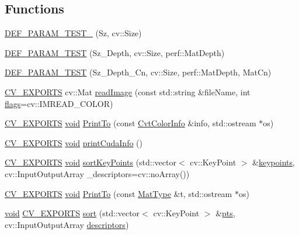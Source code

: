 \subsection*{Functions}
\begin{DoxyCompactItemize}
\item 
\hyperlink{namespaceperf_aee4aac75a52f21b615b8a0e3a5865629}{D\-E\-F\-\_\-\-P\-A\-R\-A\-M\-\_\-\-T\-E\-S\-T\-\_} (Sz, cv\-::\-Size)
\item 
\hyperlink{namespaceperf_abe6d05b643a7d681b3e139d83b9d2d64}{D\-E\-F\-\_\-\-P\-A\-R\-A\-M\-\_\-\-T\-E\-S\-T} (Sz\-\_\-\-Depth, cv\-::\-Size, perf\-::\-Mat\-Depth)
\item 
\hyperlink{namespaceperf_a348406073b8cfba77c7265fcec8466cc}{D\-E\-F\-\_\-\-P\-A\-R\-A\-M\-\_\-\-T\-E\-S\-T} (Sz\-\_\-\-Depth\-\_\-\-Cn, cv\-::\-Size, perf\-::\-Mat\-Depth, Mat\-Cn)
\item 
\hyperlink{core_2types__c_8h_a1bf9f0e121b54272da02379cfccd0a2b}{C\-V\-\_\-\-E\-X\-P\-O\-R\-T\-S} cv\-::\-Mat \hyperlink{namespaceperf_a83899156f75eac1b6ab0c9630ae0f2d0}{read\-Image} (const std\-::string \&file\-Name, int \hyperlink{highgui__c_8h_ae51e3a2d4365e85db9630dd3ce9508db}{flags}=cv\-::\-I\-M\-R\-E\-A\-D\-\_\-\-C\-O\-L\-O\-R)
\item 
\hyperlink{core_2types__c_8h_a1bf9f0e121b54272da02379cfccd0a2b}{C\-V\-\_\-\-E\-X\-P\-O\-R\-T\-S} \hyperlink{legacy_8hpp_a8bb47f092d473522721002c86c13b94e}{void} \hyperlink{namespaceperf_ac433f45f9fbed2bb542f82867dd3823c}{Print\-To} (const \hyperlink{structperf_1_1CvtColorInfo}{Cvt\-Color\-Info} \&info, std\-::ostream $\ast$os)
\item 
\hyperlink{core_2types__c_8h_a1bf9f0e121b54272da02379cfccd0a2b}{C\-V\-\_\-\-E\-X\-P\-O\-R\-T\-S} \hyperlink{legacy_8hpp_a8bb47f092d473522721002c86c13b94e}{void} \hyperlink{namespaceperf_aea633a4d17697bbb9c8815309677c894}{print\-Cuda\-Info} ()
\item 
\hyperlink{core_2types__c_8h_a1bf9f0e121b54272da02379cfccd0a2b}{C\-V\-\_\-\-E\-X\-P\-O\-R\-T\-S} \hyperlink{legacy_8hpp_a8bb47f092d473522721002c86c13b94e}{void} \hyperlink{namespaceperf_aec35791c2eaab450915b88e6e80e585e}{sort\-Key\-Points} (std\-::vector$<$ cv\-::\-Key\-Point $>$ \&\hyperlink{compat_8hpp_af95b6678bbbdd664ed15fe6d4190d355}{keypoints}, cv\-::\-Input\-Output\-Array \-\_\-descriptors=cv\-::no\-Array())
\item 
\hyperlink{core_2types__c_8h_a1bf9f0e121b54272da02379cfccd0a2b}{C\-V\-\_\-\-E\-X\-P\-O\-R\-T\-S} \hyperlink{legacy_8hpp_a8bb47f092d473522721002c86c13b94e}{void} \hyperlink{namespaceperf_a5af9ada3b18517950993017cdde078ee}{Print\-To} (const \hyperlink{classperf_1_1MatType}{Mat\-Type} \&t, std\-::ostream $\ast$os)
\item 
\hyperlink{legacy_8hpp_a8bb47f092d473522721002c86c13b94e}{void} \hyperlink{core_2types__c_8h_a1bf9f0e121b54272da02379cfccd0a2b}{C\-V\-\_\-\-E\-X\-P\-O\-R\-T\-S} \hyperlink{namespaceperf_ab13b16a0f5e3f27a0f51aa412796276a}{sort} (std\-::vector$<$ cv\-::\-Key\-Point $>$ \&\hyperlink{core__c_8h_ab62b1919fa12a68dd1196a0d42f7937e}{pts}, cv\-::\-Input\-Output\-Array \hyperlink{compat_8hpp_a1e3702ddbca6258f57508c22eff26bf2}{descriptors})
\end{DoxyCompactItemize}

